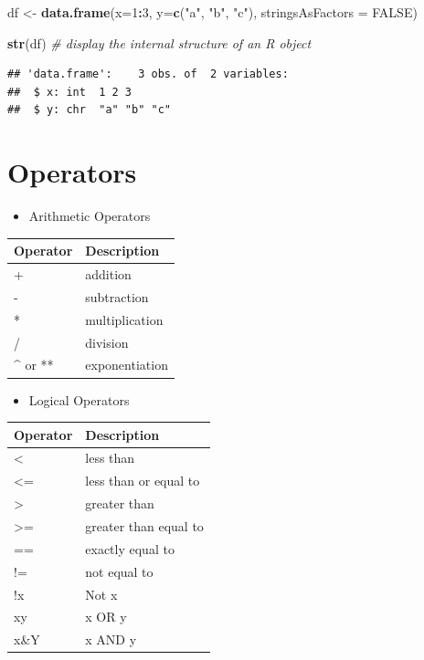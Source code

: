 \documentclass[]{book}
\newenvironment{Shaded}{\begin{snugshade}}{\end{snugshade}}
\newcommand{\CommentTok}[1]{\textcolor[rgb]{0.56,0.35,0.01}{\textit{#1}}}
\newcommand{\DataTypeTok}[1]{\textcolor[rgb]{0.13,0.29,0.53}{#1}}
\newcommand{\DecValTok}[1]{\textcolor[rgb]{0.00,0.00,0.81}{#1}}
\newcommand{\KeywordTok}[1]{\textcolor[rgb]{0.13,0.29,0.53}{\textbf{#1}}}
\newcommand{\NormalTok}[1]{#1}
\newcommand{\OperatorTok}[1]{\textcolor[rgb]{0.81,0.36,0.00}{\textbf{#1}}}
\newcommand{\OtherTok}[1]{\textcolor[rgb]{0.56,0.35,0.01}{#1}}
\newcommand{\StringTok}[1]{\textcolor[rgb]{0.31,0.60,0.02}{#1}}
\providecommand{\tightlist}{%
  \setlength{\itemsep}{0pt}\setlength{\parskip}{0pt}}
\begin{document}
\begin{Shaded}
\begin{Highlighting}[]
\NormalTok{df <-}\StringTok{ }\KeywordTok{data.frame}\NormalTok{(}\DataTypeTok{x=}\DecValTok{1}\OperatorTok{:}\DecValTok{3}\NormalTok{, }\DataTypeTok{y=}\KeywordTok{c}\NormalTok{(}\StringTok{"a"}\NormalTok{, }\StringTok{"b"}\NormalTok{, }\StringTok{"c"}\NormalTok{), }\DataTypeTok{stringsAsFactors =} \OtherTok{FALSE}\NormalTok{)}
\end{Highlighting}
\end{Shaded}

\begin{Shaded}
\begin{Highlighting}[]
\KeywordTok{str}\NormalTok{(df) }\CommentTok{# display the internal structure of an R object}
\end{Highlighting}
\end{Shaded}

\begin{verbatim}
## 'data.frame':    3 obs. of  2 variables:
##  $ x: int  1 2 3
##  $ y: chr  "a" "b" "c"
\end{verbatim}

\hypertarget{operators}{%
\section{Operators}\label{operators}}

\begin{itemize}
\tightlist
\item
  Arithmetic Operators
\end{itemize}

\begin{longtable}[]{@{}ll@{}}
\toprule
Operator & Description\tabularnewline
\midrule
\endhead
+ & addition\tabularnewline
- & subtraction\tabularnewline
* & multiplication\tabularnewline
/ & division\tabularnewline
\^{} or ** & exponentiation\tabularnewline
\bottomrule
\end{longtable}

\begin{itemize}
\tightlist
\item
  Logical Operators
\end{itemize}

\begin{longtable}[]{@{}ll@{}}
\toprule
Operator & Description\tabularnewline
\midrule
\endhead
\textless{} & less than\tabularnewline
\textless{}= & less than or equal to\tabularnewline
\textgreater{} & greater than\tabularnewline
\textgreater{}= & greater than equal to\tabularnewline
== & exactly equal to\tabularnewline
!= & not equal to\tabularnewline
!x & Not x\tabularnewline
x\textbar{}y & x OR y\tabularnewline
x\&Y & x AND y\tabularnewline
\bottomrule
\end{longtable}
\end{document}
